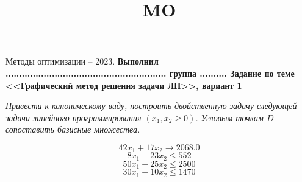 \documentclass{article}
\title{MO}
\begin{document}
\begin{center}
	Методы оптимизации -- 2023.
	\textbf{Выполнил ........................................................... группа ..........
Задание по теме <<Графический метод решения задачи ЛП>>, вариант 1}
\end{center}

\begin{flushleft}
	\textit{    Привести к каноническому виду, построить двойственную задачу следующей задачи линейного программирования $(x_1,x_2 \geq 0)$. Угловым точкам $D$ сопоставить базисные множества.}
\end{flushleft}

\begin{displaymath}
	42x_1+17x_2 \rightarrow2068.0
\end{displaymath}
\begin{displaymath}
	8x_1+23x_2 \leq552
\end{displaymath}
\begin{displaymath}
	50x_1+25x_2 \leq2500
\end{displaymath}
\begin{displaymath}
	30x_1+10x_2 \leq1470
\end{displaymath}
 \vspace{55}
\end{document}
